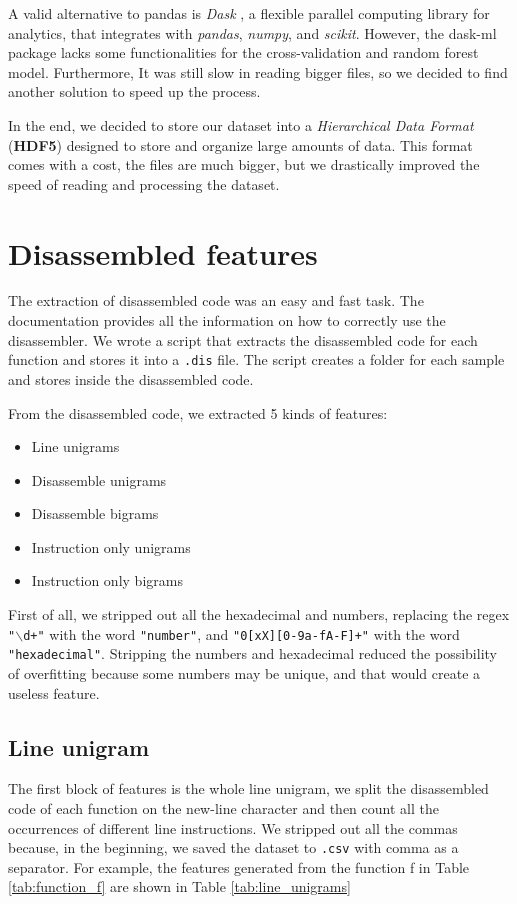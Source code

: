 A valid alternative to pandas is \textit{Dask} \cite{dask}, a flexible parallel computing library for analytics, that integrates with \textit{pandas},  \textit{numpy}, and \textit{scikit}. However, the dask-ml package lacks some functionalities for the cross-validation and random forest model. Furthermore, It was still slow in reading bigger files, so we decided to find another solution to speed up the process.

In the end, we decided to store our dataset into a \textit{Hierarchical Data Format} (\textbf{HDF5}) \cite{hdf} designed to store and organize large amounts of data. This format comes with a cost, the files are much bigger, but we drastically improved the speed of reading and processing the dataset.


\section{Disassembled features}

The extraction of disassembled code was an easy and fast task. The documentation provides all the information on how to correctly use the disassembler. We wrote a script that extracts the disassembled code for each function and stores it into a \texttt{.dis} file. The script creates a folder for each sample and stores inside the disassembled code.

From the disassembled code, we extracted 5 kinds of features:
\begin{itemize}
	\item{Line unigrams}
	\item{Disassemble unigrams}
	\item{Disassemble bigrams}
	\item{Instruction only unigrams}
	\item{Instruction only bigrams}
\end{itemize}

First of all, we stripped out all the hexadecimal and numbers, replacing the regex \texttt{"$\backslash$d+"} with the word \texttt{"number"}, and \texttt{"0[xX][0-9a-fA-F]+"} with the word \texttt{"hexadecimal"}. Stripping the numbers and hexadecimal reduced the possibility of overfitting because some numbers may be unique, and that would create a useless feature.


\subsection{Line unigram}
The first block of features is the whole line unigram, we split the disassembled code of each function on the new-line character and then count all the occurrences of different line instructions. We stripped out all the commas because, in the beginning, we saved the dataset to \texttt{.csv} with comma as a separator. For example, the features generated from the function f in Table \ref{tab:function_f} are shown in Table \ref{tab:line_unigrams}

